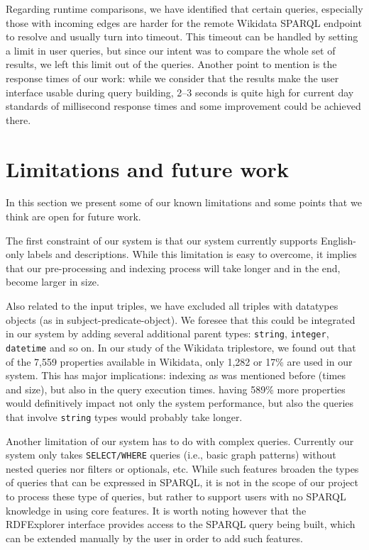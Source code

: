 Regarding runtime comparisons, we have identified that certain queries, especially those with incoming edges are harder for the remote Wikidata SPARQL endpoint to resolve and usually turn into timeout. This timeout can be handled by setting a limit in user queries, but since our intent was to compare the whole set of results, we left this limit out of the queries. Another point to mention is the response times of our work: while we consider that the results make the user interface usable during query building, 2--3 seconds is quite high for current day standards of millisecond response times and some improvement could be achieved there.


\section{Limitations and future work}
\label{chap:futureWork}

In this section we present some of our known limitations and some points that we think are open for future work.

The first constraint of our system is that our system currently supports English-only labels and descriptions. While this limitation is easy to overcome, it implies that our pre-processing and indexing process will take longer and in the end, become larger in size. 

Also related to the input triples, we have excluded all triples with datatypes objects (as in subject-predicate-object). We foresee that this could be integrated in our system by adding several additional parent types: \texttt{string}, \texttt{integer}, \texttt{datetime} and so on. In our study of the Wikidata triplestore, we found out that of the 7,559 properties available in Wikidata, only 1,282 or 17\% are used in our system. This has major implications: indexing as was mentioned before (times and size), but also in the query execution times. having 589\% more properties would definitively impact not only the system performance, but also the queries that involve \texttt{string} types would probably take longer.

Another limitation of our system has to do with complex queries. Currently our system only takes \texttt{SELECT/WHERE} queries (i.e., basic graph patterns) without nested queries nor filters or optionals, etc. While such features broaden the types of queries that can be expressed in SPARQL, it is not in the scope of our project to process these type of queries, but rather to support users with no SPARQL knowledge in using core features. It is worth noting however that the RDFExplorer interface provides access to the SPARQL query being built, which can be extended manually by the user in order to add such features.

